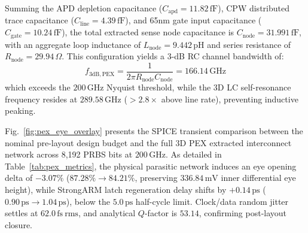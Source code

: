 \documentclass[journal]{IEEEtran}
\begin{document}
Summing the APD depletion capacitance ($C_{\mathrm{apd}} = 11.82\,\mathrm{fF}$), CPW distributed trace capacitance ($C_{\mathrm{line}} = 4.39\,\mathrm{fF}$), and 65nm gate input capacitance ($C_{\mathrm{gate}} = 10.24\,\mathrm{fF}$), the total extracted sense node capacitance is $C_{\mathrm{node}} = 31.991\,\mathrm{fF}$, with an aggregate loop inductance of $L_{\mathrm{node}} = 9.442\,\mathrm{pH}$ and series resistance of $R_{\mathrm{node}} = 29.94\,\Omega$. This configuration yields a 3-dB RC channel bandwidth of:
\begin{equation}
    f_{\mathrm{3dB,PEX}} = \frac{1}{2\pi R_{\mathrm{node}} C_{\mathrm{node}}} = 166.14\,\mathrm{GHz}
\end{equation}
which exceeds the $200\,\mathrm{GHz}$ Nyquist threshold, while the 3D LC self-resonance frequency resides at $289.58\,\mathrm{GHz}$ ($>2.8\times$ above line rate), preventing inductive peaking.

Fig.~\ref{fig:pex_eye_overlay} presents the SPICE transient comparison between the nominal pre-layout design budget and the full 3D PEX extracted interconnect network across 8,192 PRBS bits at $200\,\mathrm{GHz}$. As detailed in Table~\ref{tab:pex_metrics}, the physical parasitic network induces an eye opening delta of $-3.07\%$ ($87.28\% \to 84.21\%$, preserving $336.84\,\mathrm{mV}$ inner differential eye height), while StrongARM latch regeneration delay shifts by $+0.14\,\mathrm{ps}$ ($0.90\,\mathrm{ps} \to 1.04\,\mathrm{ps}$), below the $5.0\,\mathrm{ps}$ half-cycle limit. Clock/data random jitter settles at $62.0\,\mathrm{fs~rms}$, and analytical $Q$-factor is $53.14$, confirming post-layout closure.
\end{document}
